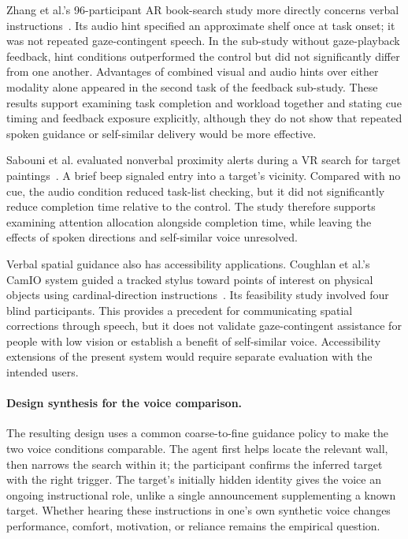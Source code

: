 Zhang et al.'s 96-participant AR book-search study more directly concerns verbal instructions~\cite{zhang2023seehear}. Its audio hint specified an approximate shelf once at task onset; it was not repeated gaze-contingent speech. In the sub-study without gaze-playback feedback, hint conditions outperformed the control but did not significantly differ from one another. Advantages of combined visual and audio hints over either modality alone appeared in the second task of the feedback sub-study. These results support examining task completion and workload together and stating cue timing and feedback exposure explicitly, although they do not show that repeated spoken guidance or self-similar delivery would be more effective.

Sabouni et al. evaluated nonverbal proximity alerts during a VR search for target paintings~\cite{sabouni2025guidance}. A brief beep signaled entry into a target's vicinity. Compared with no cue, the audio condition reduced task-list checking, but it did not significantly reduce completion time relative to the control. The study therefore supports examining attention allocation alongside completion time, while leaving the effects of spoken directions and self-similar voice unresolved.

Verbal spatial guidance also has accessibility applications. Coughlan et al.'s CamIO system guided a tracked stylus toward points of interest on physical objects using cardinal-direction instructions~\cite{coughlan2020spatial}. Its feasibility study involved four blind participants. This provides a precedent for communicating spatial corrections through speech, but it does not validate gaze-contingent assistance for people with low vision or establish a benefit of self-similar voice. Accessibility extensions of the present system would require separate evaluation with the intended users.

\paragraph{Design synthesis for the voice comparison.}
The resulting design uses a common coarse-to-fine guidance policy to make the two voice conditions comparable. The agent first helps locate the relevant wall, then narrows the search within it; the participant confirms the inferred target with the right trigger. The target's initially hidden identity gives the voice an ongoing instructional role, unlike a single announcement supplementing a known target. Whether hearing these instructions in one's own synthetic voice changes performance, comfort, motivation, or reliance remains the empirical question.

